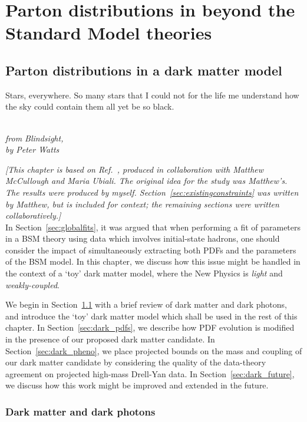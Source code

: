 \documentclass[withindex,glossary]{cam-thesis}
\begin{document}
\newpage
\part{Parton distributions in beyond the Standard Model theories}
\chapter{Parton distributions in a dark matter model}
\label{chap:darkphoton}

\epigraph{Stars, everywhere. So many stars that I could not for the life me understand how the sky could contain them all yet be so black.}{\textit{\\ from Blindsight, \\ by Peter Watts}}

\noindent \textit{[This chapter is based on Ref.~\cite{McCullough:2022hzr}, produced in collaboration with Matthew McCullough and Maria Ubiali. The original idea for the study was Matthew's. The results were produced by myself. Section~\ref{sec:existingconstraints} was written by Matthew, but is included for context; the remaining sections were written collaboratively.]}\\

\noindent In Section~\ref{sec:globalfits}, it was argued that when performing a fit of parameters in a BSM theory using data which involves initial-state hadrons, one should consider the impact of simultaneously extracting both PDFs and the parameters of the BSM model. In this chapter, we discuss how this issue might be handled in the context of a `toy' dark matter model, where the New Physics is \textit{light} and \textit{weakly-coupled}.

We begin in Section~\ref{sec:darkphoton} with a brief review of dark matter and dark photons, and introduce the `toy' dark matter model which shall be used in the rest of this chapter. In Section~\ref{sec:dark_pdfs}, we describe how PDF evolution is modified in the presence of our proposed dark matter candidate. In Section~\ref{sec:dark_pheno}, we place projected bounds on the mass and coupling of our dark matter candidate by considering the quality of the data-theory agreement on projected high-mass Drell-Yan data. In Section~\ref{sec:dark_future}, we discuss how this work might be improved and extended in the future.


\section{Dark matter and dark photons}
\label{sec:darkphoton}
\end{document}
